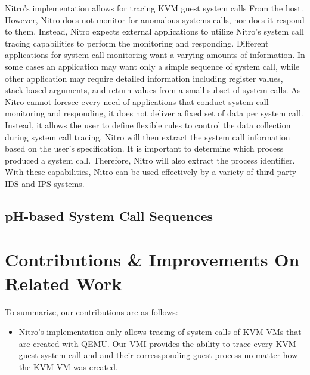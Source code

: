\documentclass{report}
\begin{document}
\begin{spacing}{1.5}
{\large
\leavevmode\newline
Nitro's implementation allows for tracing KVM guest system calls From the host. However, Nitro does not monitor for anomalous systems calls, nor does it respond to them. Instead, Nitro expects external applications to utilize Nitro's system call tracing capabilities to perform the monitoring and responding. Different applications for system call monitoring want a varying amounts of information. In some cases an application may want only a simple sequence of system call, while other application may require detailed information including register values, stack-based arguments, and return values from a small subset of system calls. As Nitro cannot foresee every need of applications that conduct system call monitoring and responding, it does not deliver a fixed set of data per system call. Instead, it allows the user to define flexible rules to control the data collection during system call tracing. Nitro will then extract the system call information based on the user's specification. It is important to determine which process produced a system call. Therefore, Nitro will also extract the process identifier. With these capabilities, Nitro can be used effectively by a variety of third party IDS and IPS systems.
\newline
}




\section{pH-based System Call Sequences}

{\large

\leavevmode\newline
}









\chapter{Contributions \& Improvements On Related Work}

{\large
To summarize, our contributions are as follows:

\begin{itemize}
  \item Nitro's implementation only allows tracing of system calls of KVM VMs that are created with QEMU. Our VMI provides the ability to trace every KVM guest system call and and their corressponding guest process no matter how the KVM VM was created.


\end{itemize}}
\end{spacing}
\end{document}

